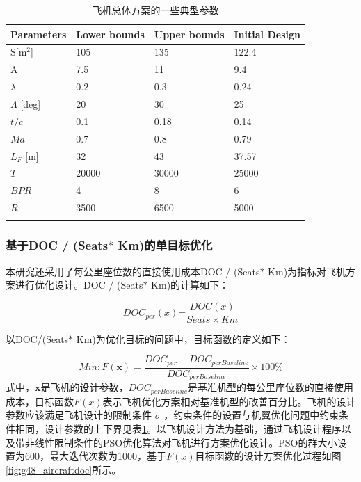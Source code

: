 \documentclass[12pt,a4paper]{report}
\begin{document}
\begin{table}
\centering
\caption{飞机总体方案的一些典型参数}
\begin{tabular}{|p{2.4cm}|p{2.4cm}|p{2.4cm}|p{2.4cm}|}
\hhline{|====|}
Parameters	& Lower bounds	& Upper bounds	& Initial Design \\ \hline
S[m$^2$]	& 105	& 135	& 122.4 \\ \hline
A	&7.5	& 11	& 9.4 \\ \hline
$\lambda$ 	& 0.2	& 0.3	& 0.24 \\ \hline
$\Lambda$ [deg] &	20	& 30	&25 \\ \hline
$t/c$	& 0.1	& 0.18	& 0.14 \\ \hline
$Ma$	& 0.7	& 0.8	& 0.79 \\ \hline
$L_F$ [m] & 32	&  43	& 37.57 \\ \hline
$T$  & 20000	& 30000	& 25000 \\ \hline
$BPR$ & 4	& 8  &  6 \\ \hline
$R$  & 3500	&  6500	&  5000 \\ \hhline{|====|}
\end{tabular}
\label{aircraft-pars}
\end{table}

\subsubsection{基于DOC / (Seats$\ast$ Km)的单目标优化}
本研究还采用了每公里座位数的直接使用成本DOC / (Seats$\ast$ Km)为指标对飞机方案进行优化设计。DOC / (Seats$\ast$ Km)的计算如下：

\begin{equation}
DO{{C}_{per}}(x)\text{=}\frac{DOC(x)}{Seats\times Km} 
\end{equation}

以DOC/(Seats$\ast$ Km)为优化目标的问题中，目标函数的定义如下：

\begin{equation}
Min: F(\textbf{x})=\frac{DOC_{per}-DOC_{perBaseline}}{DOC_{perBaseline}} \times 100\%
\end{equation}
式中，$\textbf{x}$是飞机的设计参数，$DOC_{perBaseline}$是基准机型的每公里座位数的直接使用成本，目标函数$F(x)$表示飞机优化方案相对基准机型的改善百分比。飞机的设计参数应该满足飞机设计的限制条件 $  \sigma  $ ，约束条件的设置与机翼优化问题中约束条件相同，设计参数的上下界见表\ref{aircraft-pars}。以飞机设计方法为基础，通过飞机设计程序以及带非线性限制条件的PSO优化算法对飞机进行方案优化设计。PSO的群大小设置为600，最大迭代次数为1000，基于$F(x)$目标函数的设计方案优化过程如图\ref{fig:g48_aircraftdoc}所示。
\end{document}
